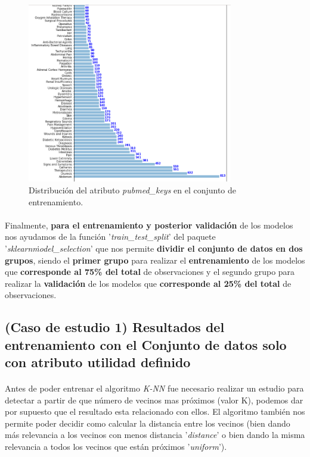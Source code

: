 \begin{figure}[!htb]
  \centering
    \includegraphics[width=0.8\textwidth]{images/resultados_knn_keywords.png}
    \caption{Distribución del atributo \textit{pubmed\_keys} en el conjunto de entrenamiento.}
  \label{knnDistKeywords}
\end{figure}

\paragraph{}
Finalmente, \textbf{para el entrenamiento y posterior validación} de los modelos nos ayudamos de la función '\textit{train\_test\_split}'\cite{ref:knn_train_test_split} del paquete '\textit{sklearn\.model\_selection}' que nos permite \textbf{dividir el conjunto de datos en dos grupos}, siendo el \textbf{primer grupo} para realizar el \textbf{entrenamiento} de los modelos que \textbf{corresponde al 75\% del total} de observaciones y el segundo grupo para realizar la \textbf{validación} de los modelos que \textbf{corresponde al 25\% del total} de observaciones.

\subsection{(Caso de estudio 1) Resultados del entrenamiento con el Conjunto de datos solo con atributo utilidad definido}

\paragraph{}
Antes de poder entrenar el algoritmo \textit{K-NN} fue necesario realizar un estudio para detectar a partir de que número de vecinos mas próximos (valor K), podemos dar por supuesto que el resultado esta relacionado con ellos. El algoritmo también nos permite poder decidir como calcular la distancia entre los vecinos (bien dando más relevancia a los vecinos con menos distancia '\textit{distance}'\cite{ref:knn_doc} o bien dando la misma relevancia a todos los vecinos que están próximos '\textit{uniform}'\cite{ref:knn_doc}).

